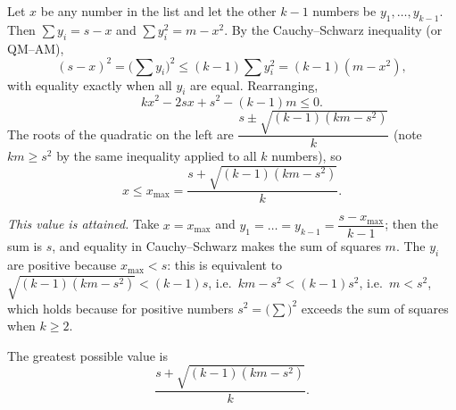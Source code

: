 Let $x$ be any number in the list and let the other $k-1$ numbers be $y_1,\dots,y_{k-1}$. Then $\sum y_i=s-x$ and $\sum y_i^2=m-x^2$. By the Cauchy--Schwarz inequality (or QM--AM),
\[
(s-x)^2=\Big(\sum y_i\Big)^2\le (k-1)\sum y_i^2=(k-1)(m-x^2),
\]
with equality exactly when all $y_i$ are equal. Rearranging,
\[
kx^2-2sx+s^2-(k-1)m\le0 .
\]
The roots of the quadratic on the left are $\dfrac{s\pm\sqrt{(k-1)(km-s^2)}}{k}$ (note $km\ge s^2$ by the same inequality applied to all $k$ numbers), so
\[
x\le x_{\max}=\dfrac{s+\sqrt{(k-1)(km-s^2)}}{k}.
\]

\emph{This value is attained.} Take $x=x_{\max}$ and $y_1=\dots=y_{k-1}=\dfrac{s-x_{\max}}{k-1}$; then the sum is $s$, and equality in Cauchy--Schwarz makes the sum of squares $m$. The $y_i$ are positive because $x_{\max}<s$: this is equivalent to $\sqrt{(k-1)(km-s^2)}<(k-1)s$, i.e.\ $km-s^2<(k-1)s^2$, i.e.\ $m<s^2$, which holds because for positive numbers $s^2=\big(\sum\big)^2$ exceeds the sum of squares when $k\ge2$.

The greatest possible value is
\[
\boxed{\dfrac{s+\sqrt{(k-1)(km-s^2)}}{k}}.
\]
